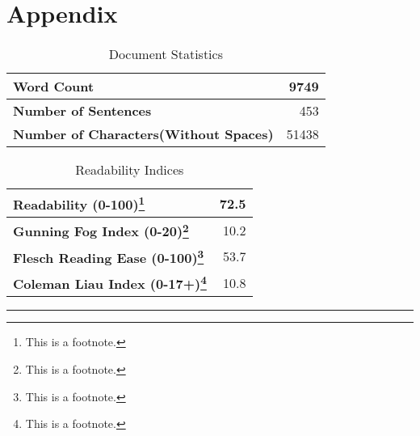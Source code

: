 \documentclass[table,french,english]{rapportCS}
\begin{document}
\section*{Appendix}\label{sec:appendix}
\begin{table}[h]
      \centering
      \begin{tabular}{|l|r|}
        \hline
        \textbf{Word Count} & 9749 \\
        \hline
        \textbf{Number of Sentences} & 453 \\
        \hline
        \textbf{Number of Characters(Without Spaces)} & 51438 \\
        \hline
      \end{tabular}
      \caption{Document Statistics}
      \label{tab:documentstats}
    \end{table}
    \begin{table}[h]
      \centering
      \begin{tabular}{|l|r|}
        \hline
        \textbf{Readability (0-100)\footnote{This is a footnote.}} & 72.5 \\
        \hline
        \textbf{Gunning Fog Index (0-20)\footnote{This is a footnote.}} & 10.2 \\
        \hline
        \textbf{Flesch Reading Ease (0-100)\footnote{This is a footnote.}} & 53.7 \\
        \hline
        \textbf{Coleman Liau Index (0-17+)\footnote{This is a footnote.}} & 10.8 \\
        \hline
      \end{tabular}
      \caption{Readability Indices}
      \label{tab:readability}
    \end{table}
\rule{\linewidth}{0.5pt}
\textbf{}\newline
\end{document}
